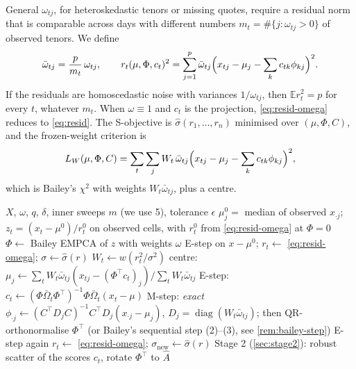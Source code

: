 \documentclass[11pt]{article}
\theoremstyle{definition}
\theoremstyle{remark}
\newcommand{\E}{\mathbb{E}}
\begin{document}
General $\omega_{tj}$, for heteroskedastic tenors or missing quotes, require a residual norm that is comparable across
days with different numbers $m_t=\#\{j:\omega_{tj}>0\}$ of observed tenors. We define
\begin{equation}\label{eq:resid-omega}
\bar\omega_{tj}=\frac{p}{m_t}\,\omega_{tj},\qquad
r_t(\mu,\Phi,c_t)^2=\sum_{j=1}^p\bar\omega_{tj}\Bigl(x_{tj}-\mu_j-\sum_kc_{tk}\phi_{kj}\Bigr)^2 .
\end{equation}
If the residuals are homoscedastic noise with variances $1/\omega_{tj}$, then $\E r_t^2=p$ for every $t$, whatever $m_t$.
When $\omega\equiv1$ and $c_t$ is the projection, \eqref{eq:resid-omega} reduces to \eqref{eq:resid}. The S-objective
is $\hat\sigma(r_1,\dots,r_n)$ minimised over $(\mu,\Phi,C)$, and the frozen-weight criterion is
\begin{equation}\label{eq:LW-omega}
L_W(\mu,\Phi,C)=\sum_t\sum_jW_t\,\bar\omega_{tj}\Bigl(x_{tj}-\mu_j-\sum_kc_{tk}\phi_{kj}\Bigr)^2,
\end{equation}
which is Bailey's $\chi^2$ with weights $W_t\bar\omega_{tj}$, plus a centre.

\begin{algorithm}[t]
\caption{Robust EMPCA (outer M-scale reweighting, inner weighted EMPCA)}\label{alg:rempca}
\begin{algorithmic}[1]
\Require $X$, $\omega$, $q$, $\delta$, inner sweeps $m$ (we use 5), tolerance $\epsilon$
\State $\mu^0_j=$ median of observed $x_{\cdot j}$; $z_t=(x_t-\mu^0)/r_t^0$ on observed cells, with $r_t^0$ from \eqref{eq:resid-omega} at $\Phi=0$
\State $\Phi\gets$ Bailey EMPCA of $z$ with weights $\omega$ 
\State E-step on $x-\mu^0$; $r_t\gets$ \eqref{eq:resid-omega}; $\sigma\gets\hat\sigma(r)$
\Repeat
\State $W_t\gets w(r_t^2/\sigma^2)$ 
 
\State centre: $\mu_j\gets\sum_tW_t\bar\omega_{tj}(x_{tj}-(\Phi^\top c_t)_j)\big/\sum_tW_t\bar\omega_{tj}$
\State E-step: $c_t\gets(\Phi\bar\Omega_t\Phi^\top)^{-1}\Phi\bar\Omega_t(x_t-\mu)$ 
\State M-step: \emph{exact} $\phi_{\cdot j}\gets(C^\top D_jC)^{-1}C^\top D_j(x_{\cdot j}-\mu_j)$, $D_j=\operatorname{diag}(W_t\bar\omega_{tj})$; then QR-orthonormalise $\Phi^\top$
\State \phantom{M-step: }(or Bailey's sequential step (2)--(3), see \cref{rem:bailey-step})
\State E-step again
\EndFor
\State $r_t\gets$ \eqref{eq:resid-omega}; $\sigma_{\text{new}}\gets\hat\sigma(r)$
\State Stage 2 (\cref{sec:stage2}): robust scatter of the scores $c_t$, rotate $\Phi^\top$ to $\hat A$
\end{algorithmic}
\end{algorithm}
\end{document}
